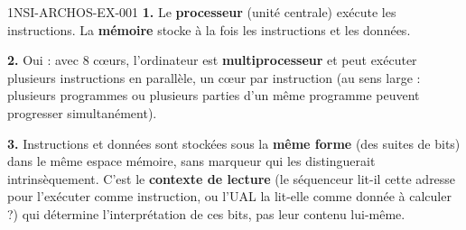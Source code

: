 \begin{corrige}{1NSI-ARCHOS-EX-001}
\textbf{1.} Le \textbf{processeur} (unité centrale) exécute les instructions. La
\textbf{mémoire} stocke à la fois les instructions et les données.

\textbf{2.} Oui : avec $8$ cœurs, l'ordinateur est \textbf{multiprocesseur} et peut exécuter
plusieurs instructions en parallèle, un cœur par instruction (au sens large : plusieurs
programmes ou plusieurs parties d'un même programme peuvent progresser simultanément).

\textbf{3.} Instructions et données sont stockées sous la \textbf{même forme} (des suites de
bits) dans le même espace mémoire, sans marqueur qui les distinguerait intrinsèquement.
C'est le \textbf{contexte de lecture} (le séquenceur lit-il cette adresse pour l'exécuter
comme instruction, ou l'UAL la lit-elle comme donnée à calculer ?) qui détermine
l'interprétation de ces bits, pas leur contenu lui-même.
\end{corrige}
